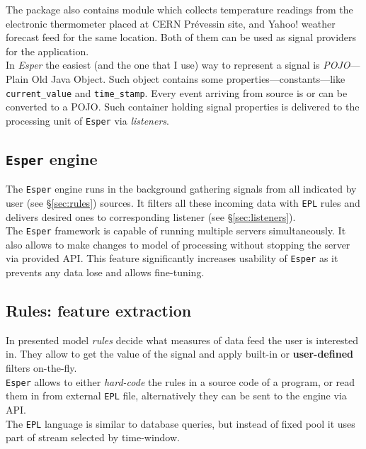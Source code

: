 \documentclass[11pt, letterpaper]{article}            %
\begin{document}
The package also contains module which collects temperature readings from the electronic thermometer placed at CERN Prévessin site, and Yahoo! weather forecast feed for the same location. Both of them can be used as signal providers for the application.\\

In \emph{Esper} the easiest (and the one that I use) way to represent a signal is \emph{POJO}---Plain Old Java Object. Such object contains some properties---constants---like \texttt{current_value} and \texttt{time_stamp}. Every event arriving from source is or can be converted to a POJO. Such container holding signal properties is delivered to the processing unit of \texttt{Esper} via \emph{listeners}.

\subsection{\texttt{Esper} engine}
The \texttt{Esper} engine runs in the background gathering signals from all indicated by user (see §\ref{sec:rules}) sources. It filters all these incoming data with \texttt{EPL} rules and delivers desired ones to corresponding listener (see §\ref{sec:listeners}).\\
The \texttt{Esper} framework is capable of running multiple servers simultaneously. It also allows to make changes to model of processing without stopping the server via provided API. This feature significantly increases usability of \texttt{Esper} as it prevents any data lose and allows fine-tuning.\\

\subsection{Rules: feature extraction\label{sec:rules}}
In presented model \emph{rules} decide what measures of data feed the user is interested in. They allow to get the value of the signal and apply built-in or \textbf{user-defined} filters on-the-fly.\\
\texttt{Esper} allows to either \emph{hard-code} the rules in a source code of a program, or read them in from external \texttt{EPL} file, alternatively they can be sent to the engine via API.\\
The \texttt{EPL} language is similar to database queries, but instead of fixed pool it uses part of stream selected by time-window.\\
\end{document}
